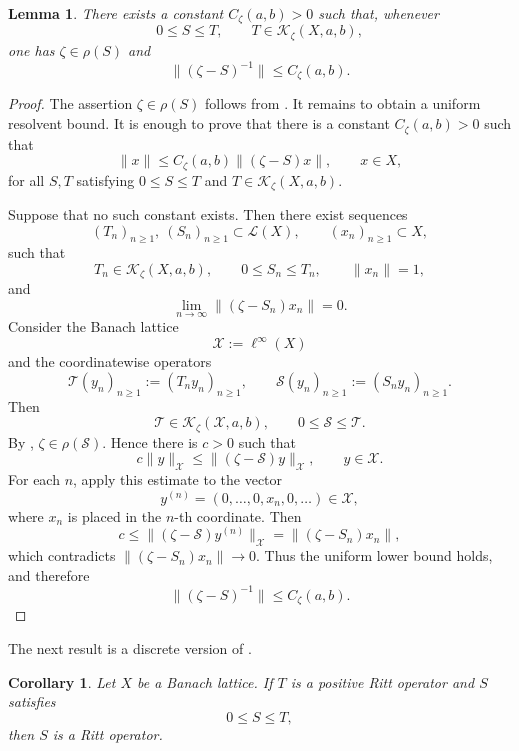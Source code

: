\documentclass[11pt]{amsart}
\numberwithin{equation}{section}
\newtheorem{lemma}[theorem]{Lemma}
\newtheorem{corollary}[theorem]{Corollary}
\theoremstyle{definition}
\theoremstyle{plain}
\begin{document}
\begin{lemma}\label{lem:positive-dominated-resolvent}
There exists a constant $C_\zeta(a,b)>0$ such that, whenever
\[
   0\le S\le T,
   \qquad
   T\in\mathcal K_\zeta(X,a,b),
\]
one has $\zeta\in\rho(S)$ and
\begin{equation}\label{eq:positive-dominated-resolvent-bound}
   \|(\zeta -S)^{-1}\|\le C_\zeta(a,b).
\end{equation}
\end{lemma}
\begin{proof}
The assertion \(\zeta\in\rho(S)\) follows from \cite[Theorem~1.4]{Rabiger}.
It remains to obtain a uniform resolvent bound. It is enough to prove that
there is a constant \(C_\zeta(a,b)>0\) such that
\[
        \|x\|\le C_\zeta(a,b)\|(\zeta -S)x\|,
        \qquad x\in X,
\]
for all \(S,T\) satisfying \(0\le S\le T\) and \(T\in\mathcal K_\zeta(X,a,b)\).

Suppose that no such constant exists. 
Then there exist sequences
\[
   (T_n)_{n\ge1},\ (S_n)_{n\ge1}\subset\mathcal L(X),
   \qquad
   (x_n)_{n\ge1}\subset X,
\]
such that
\[
   T_n\in\mathcal K_\zeta(X,a,b),\qquad
   0\le S_n\le T_n,\qquad
   \|x_n\|=1,
\]
and
\[
       \lim_{n \to \infty}\|(\zeta -S_n)x_n\|=0 .
\]
Consider the Banach lattice
\[
        \mathcal X:=\ell^\infty(X)
\]
and the coordinatewise operators
\[
        \mathcal T(y_n)_{n\ge1}:=(T_ny_n)_{n\ge1},
        \qquad
        \mathcal S(y_n)_{n\ge1}:=(S_ny_n)_{n\ge1}.
\]
Then
\[
        \mathcal T\in\mathcal K_\zeta(\mathcal X,a,b),
        \qquad
        0\le \mathcal S\le\mathcal T .
\]
By \cite[Theorem~1.4]{Rabiger}, \(\zeta\in\rho(\mathcal S)\). Hence there is
\(c>0\) such that
\[
        c\|y\|_{\mathcal X}
        \le
        \|(\zeta -\mathcal S)y\|_{\mathcal X},
        \qquad y\in\mathcal X .
\]
For each \(n\), apply this estimate to the vector
\[
        y^{(n)}=(0,\ldots,0,x_n,0,\ldots)\in\mathcal X,
\]
where \(x_n\) is placed in the \(n\)-th coordinate. Then
\[
        c
        \le
        \|(\zeta -\mathcal S)y^{(n)}\|_{\mathcal X}
        =
        \|(\zeta -S_n)x_n\|,
\]
which contradicts \(\|(\zeta -S_n)x_n\|\to0\). Thus the uniform lower bound
holds, and therefore
\[
        \|(\zeta -S)^{-1}\|\le C_\zeta(a,b).
\]
\end{proof}

The next result is a discrete version of \cite[Theorem 1]{Gluck}.
\begin{corollary}\label{cor:positive-domination-ritt}
Let $X$ be a Banach lattice. If $T$ is a positive Ritt operator and $S$ satisfies
\[
   0\le S\le T,
\]
then $S$ is a Ritt operator.
\end{corollary}
\end{document}
